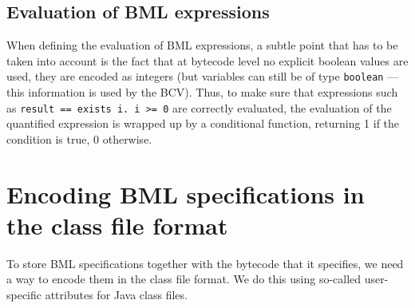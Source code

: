 \documentclass[a4paper]{llncs}
\begin{document}
	


\subsection{Evaluation of BML expressions}

When defining the evaluation of BML expressions, a subtle point that
has to be taken into account is the fact that at bytecode level no
explicit boolean values are used, they are encoded as integers (but
variables can still be of type \texttt{boolean} --- this information is
used by the BCV). Thus, to make sure that expressions such as
\texttt{\bsl result == \bsl exists i. i >= 0} are correctly evaluated,
the evaluation of the quantified expression is wrapped up by a
conditional function, returning 1 if the condition is true, 0
otherwise.



\section{Encoding BML specifications in the class file format}
\label{SecClassfile}

To store BML specifications together with the bytecode that it
specifies, we need a way to encode them in the class file format. We
do this using so-called user-specific attributes for Java class files.
\end{document}
